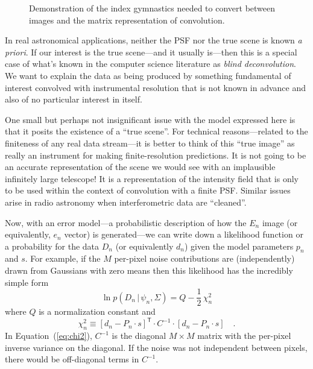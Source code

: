 \documentclass[12pt,preprint]{aastex}
\newcommand{\foreign}[1]{\emph{#1}}
\newcommand{\figlabel}[1]{\label{fig:#1}}
\newcommand{\Eq}[1]{Equation~(\ref{eq:#1})}
\newcommand{\eq}[1]{\Eq{#1}}
\newcommand{\eqlabel}[1]{\label{eq:#1}}
\newcommand{\given}{\,|\,}
\newcommand{\transpose}[1]{{#1}^{\mathsf{T}}}
\newcommand{\data}{\ensuremath{D}}
\newcommand{\scene}{\ensuremath{\Sigma}}
\newcommand{\psf}{\ensuremath{\psi}}
\newcommand{\dvec}{\ensuremath{d}}
\newcommand{\evec}{\ensuremath{e}}
\newcommand{\svec}{\ensuremath{s}}
\newcommand{\pvec}{\ensuremath{p}}
\newcommand{\dfmplot}[1]{%
\begin{center}%
\end{center}%
}
\begin{document}
\begin{figure}[!htbp]
    \dfmplot{index_gymnastics.pdf}
    \caption{Demonstration of the index gymnastics needed to convert between
        images and the matrix representation of convolution.\figlabel{index}}
\end{figure}

In real astronomical applications, neither the PSF nor the true scene
is known \foreign{a priori}. If our interest is the true scene---and
it usually is---then this is a special case of what's known in
the computer science literature as \emph{blind deconvolution}. We
want to explain the data as being produced by something fundamental of
interest convolved with instrumental resolution that is not known in
advance and also of no particular interest in itself.

One small but perhaps not insignificant issue with the model expressed
here is that it posits the existence of a ``true scene''.  For
technical reasons---related to the finiteness of any real data
stream---it is better to think of this ``true image'' as really an
instrument for making finite-resolution predictions.  It is not going
to be an accurate representation of the scene we would see with an
implausible infinitely large telescope!  It is a representation of the
intensity field that is only to be used within the context of
convolution with a finite PSF\@.  Similar issues arise in radio astronomy
when interferometric data are ``cleaned''.

Now, with an error model---a probabilistic description of how the
$E_n$ image (or equivalently, $\evec_n$ vector) is generated---we can
write down a likelihood function or a probability for the data $\data_n$
(or equivalently $\dvec_n$) given the model parameters $\pvec_n$ and
$\svec$.  For example, if the $M$ per-pixel noise contributions are
(independently) drawn from Gaussians with zero means then this likelihood
has the incredibly simple form
\begin{equation}\eqlabel{lnlike}
\ln p(\data_n \given \psf_n, \scene) = Q - \frac{1}{2}\,\chi^2_n
\end{equation}
where $Q$ is a normalization constant and
\begin{equation}\eqlabel{chi2}
    \chi^2_n \equiv \transpose{[d_n - P_n \cdot s]} \cdot C^{-1}
    \cdot [d_n - P_n \cdot s] \quad.
\end{equation}
In \eq{chi2}, $C^{-1}$ is the diagonal $M \times M$
matrix with the per-pixel inverse variance on the diagonal. If the
noise was not independent between pixels, there would be off-diagonal
terms in $C^{-1}$.
\end{document}
